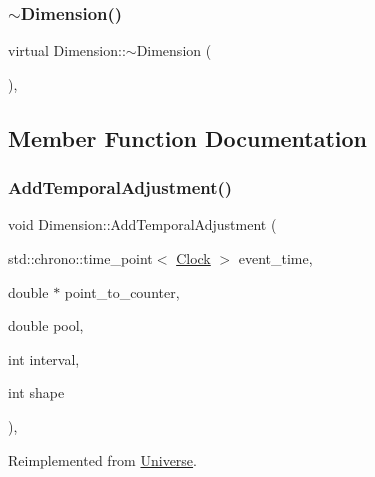 \mbox{\label{classDimension_aa990dfd442020c193a1941e9dffbfbee}} 
\subsubsection{\texorpdfstring{$\sim$\+Dimension()}{~Dimension()}}
{\footnotesize\ttfamily virtual Dimension\+::$\sim$\+Dimension (\begin{DoxyParamCaption}{ }\end{DoxyParamCaption})\hspace{0.3cm}{\ttfamily [inline]}, {\ttfamily [virtual]}}



\subsection{Member Function Documentation}
\mbox{\label{classDimension_a278d8c3df7896eb01c55283482f8674a}} 
\subsubsection{\texorpdfstring{Add\+Temporal\+Adjustment()}{AddTemporalAdjustment()}}
{\footnotesize\ttfamily void Dimension\+::\+Add\+Temporal\+Adjustment (\begin{DoxyParamCaption}\item[{std\+::chrono\+::time\+\_\+point$<$ \mbox{\hyperlink{universe_8h_a0ef8d951d1ca5ab3cfaf7ab4c7a6fd80}{Clock}} $>$}]{event\+\_\+time,  }\item[{double $\ast$}]{point\+\_\+to\+\_\+counter,  }\item[{double}]{pool,  }\item[{int}]{interval,  }\item[{int}]{shape }\end{DoxyParamCaption})\hspace{0.3cm}{\ttfamily [private]}, {\ttfamily [virtual]}}



Reimplemented from \mbox{\hyperlink{classUniverse_a901e16db5e8af258c66af7ac75662fe0}{Universe}}.

\mbox{\label{classDimension_a31e28c2777888449fad32843f6dd15ed}} 
